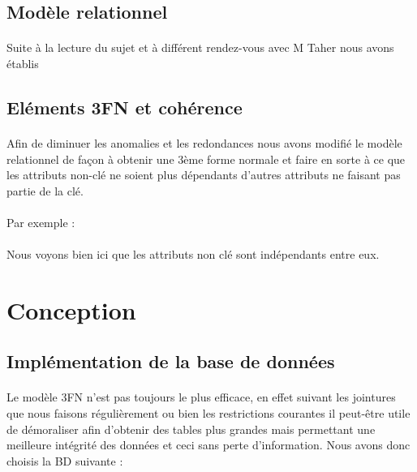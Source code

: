 \documentclass[a4paper, 12pt]{article}
\begin{document}
\subsection{Modèle relationnel}
\paragraph{}Suite à la lecture du sujet et à différent rendez-vous avec M Taher nous avons établis 

\subsection{Eléments 3FN et cohérence}
\paragraph{} Afin de diminuer les anomalies et les redondances nous avons modifié le modèle relationnel de façon à obtenir une 3ème forme normale et faire en sorte à ce que les attributs non-clé ne soient plus dépendants d’autres attributs ne faisant pas partie de la clé.
\paragraph{}Par exemple :

\paragraph{}Nous voyons bien ici que les attributs non clé sont indépendants entre eux.

\newpage

\section{Conception}
\subsection{Implémentation de la base de données}
\paragraph{}Le modèle 3FN n'est pas toujours le plus efficace, en effet suivant les jointures que nous faisons régulièrement ou bien les restrictions courantes il peut-être utile de démoraliser afin d'obtenir des tables plus grandes mais permettant une meilleure intégrité des données et ceci sans perte d'information. Nous avons donc choisis la BD suivante :
\\ \\

\newpage
\end{document}
